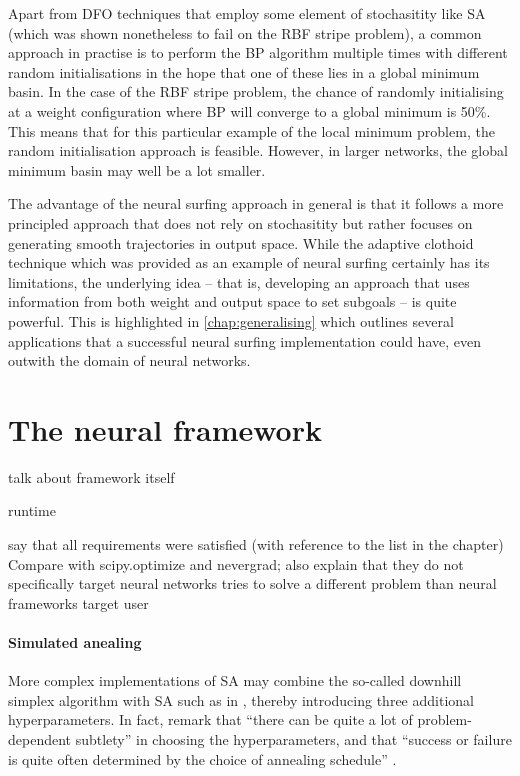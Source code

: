 Apart from DFO techniques that employ some element of stochasitity like SA (which was shown nonetheless to fail on the RBF stripe problem),
a common approach in practise is to perform the BP algorithm multiple times with different random initialisations in the hope that one of these lies in a global minimum basin.
In the case of the RBF stripe problem, the chance of randomly initialising at a weight configuration where BP will converge to a global minimum is 50\%.
This means that for this particular example of the local minimum problem, the random initialisation approach is feasible.
However, in larger networks, the global minimum basin may well be a lot smaller.

The advantage of the neural surfing approach in general is that it follows a more principled approach that does not rely on stochasitity but rather focuses on generating smooth trajectories in output space.
While the adaptive clothoid technique which was provided as an example of neural surfing certainly has its limitations, the underlying idea -- that is, developing an approach that uses information from both weight and output space to set subgoals -- is quite powerful.
This is highlighted in \ref{chap:generalising} which outlines several applications that a successful neural surfing implementation could have, even outwith the domain of neural networks.

\section{The neural framework}
\label{sec:eval_neural_framework}
talk about framework itself

runtime

say that all requirements were satisfied (with reference to the list in the chapter)
Compare with scipy.optimize and nevergrad; also explain that they do not specifically target neural networks
tries to solve a different problem than neural frameworks
target user

\paragraph{Simulated anealing}
More complex implementations of SA may combine the so-called downhill simplex algorithm \cite{nelder1965} with SA such as in \textcite[p. 444-455]{press1992}, thereby introducing three additional hyperparameters.
In fact, \citeauthor{press1992} remark that ``there can be quite a lot of problem-dependent subtlety'' in choosing the hyperparameters, and that ``success or failure is quite often determined by the choice of annealing schedule'' \cite*[p. 452]{press1992}.

